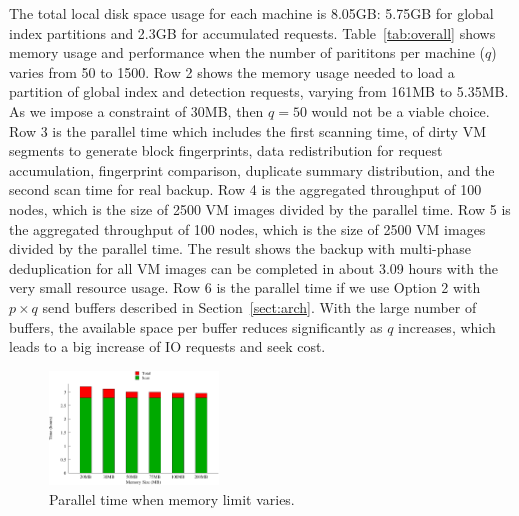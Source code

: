 The total local disk space usage for each machine is 8.05GB:  5.75GB for global index partitions and 2.3GB for accumulated requests.
Table~\ref{tab:overall} shows memory usage and performance when 
the number of parititons per machine ($q$) varies from 50 to 1500.
Row 2 shows the memory usage needed to load a partition of global index and detection requests,
varying from 161MB to 5.35MB. As we impose a constraint of 30MB, then $q=50$ would not be a viable choice.
Row 3 is the parallel time which includes the first scanning time, 
of dirty VM segments to generate block fingerprints, data redistribution for request accumulation,
fingerprint comparison, duplicate summary distribution, and the second scan time for real backup.
Row 4 is  the aggregated throughput of  100 nodes, which is  
the size of 2500 VM images divided by the parallel time. 
Row 5 is  the aggregated throughput of  100 nodes, which is  the size of 2500 VM images divided by the parallel time. 
The result shows the backup with multi-phase deduplication  for all VM images can be completed in about 3.09 hours
with the very small resource usage.
Row 6 is  the parallel time if  we use Option 2 with $p\times q$ send buffers described in Section~\ref{sect:arch}. 
With the large number of buffers, the available space per buffer reduces significantly as $q$ increases, which leads to
a big increase of IO requests and seek cost.  







\begin{figure}
\centering
\includegraphics[width=0.4\textwidth]{mem_time.pdf}
\caption{ Parallel time when memory limit varies.}
\label{fig:memory}
\end{figure}

